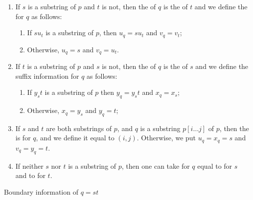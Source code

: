 \begin{algorithm}[!ht]
\centering
\begin{enumerate}
\item \label{case:s_is_substring} If $s$ is a substring of $p$ and $t$ is not,  then the  of $q$ is the  of $t$ and we define the  for $q$ as follows:
        \begin{enumerate} 
        \item  If $su_t$ is a substring of $p$, then $u_q=su_t$ and $v_q=v_t$;
        \item \label{case:t_is_substring} Otherwise, $u_q=s$ and $v_q=u_t$.
        \end{enumerate}
\item If $t$ is a substring of $p$ and $s$ is not, then the  of $q$ is the  of $s$ and we define the suffix information for $q$ as follows: 
        \begin{enumerate}
            \item \label{case:merge} If $y_s t$ is a substring of $p$ then $y_q=y_s t$ and $x_q=x_s$;
            \item \label{case:crop} Otherwise, $x_q=y_s$ and $y_q=t$;
        \end{enumerate}
\item \label{case:both_are_substring} If $s$ and $t$ are both substrings of $p$, and $q$ is a substring $p[i \dots j]$ of $p$, then the  is  for $q$, and we define it equal to $(i,j)$. Otherwise, we put $u_q=x_q=s$ and $v_q=y_q=t$. 

\item \label{case:none_is_substring} If neither $s$ nor $t$ is a substring of $p$, then one can take  for $q$ equal to  for $s$ and  to  for $t$. 
\end{enumerate}
\caption{Boundary information of $q = st$}
\label{alg:boundary}
\end{algorithm}

